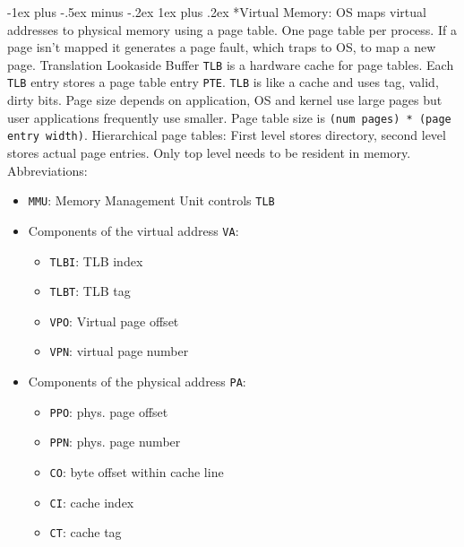 \documentclass[landscape,10pt]{article}
\makeatletter
\renewcommand{\subsubsection}{\@startsection{subsubsection}{3}{0mm}%
            {-1ex plus -.5ex minus -.2ex}%
            {1ex plus .2ex}%
            {\normalfont\small\bfseries}}
\newcommand{\code}[1]{\texttt{#1}}
\makeatother
\begin{document}
\begin{multicols}{4}
\subsubsection*{Virtual Memory:} OS maps virtual addresses to physical memory using a page table. One page table per process. If a page isn't mapped it generates a page fault, which traps to OS, to map a new page. Translation Lookaside Buffer \code{TLB} is a hardware cache for page tables. Each \code{TLB} entry stores a page table entry \code{PTE}. \code{TLB} is like a cache and uses tag, valid, dirty bits. Page size depends on application, OS and kernel use large pages but user applications frequently use smaller. Page table size is \code{(num pages) * (page entry width)}. Hierarchical page tables: First level stores directory, second level stores actual page entries. Only top level needs to be resident in memory. Abbreviations:
\begin{itemize}
    \item[] \code{MMU}: Memory Management Unit controls \code{TLB}
    \item[] Components of the virtual address \code{VA}:
    \begin{itemize}
        \item[] \code{TLBI}: TLB index
        \item[] \code{TLBT}: TLB tag
        \item[] \code{VPO}: Virtual page offset
        \item[] \code{VPN}: virtual page number
    \end{itemize}
    \item[] Components of the physical address \code{PA}:
    \begin{itemize}
        \item[] \code{PPO}: phys. page offset
        \item[] \code{PPN}: phys. page number
        \item[] \code{CO}: byte offset within cache line
        \item[] \code{CI}: cache index
        \item[] \code{CT}: cache tag
    \end{itemize}
\end{itemize}

\end{multicols}
\end{document}
